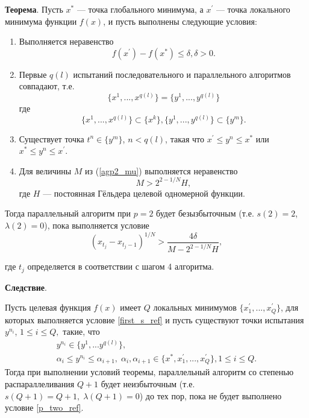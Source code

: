 \documentclass[10pt,a4paper]{book}
\begin{document}
\textbf{Теорема}. Пусть $x^*$ --- точка глобального минимума, а $x^{\prime}$ --- точка локального минимума функции $f(x)$, и пусть выполнены следующие условия:
    \begin{enumerate}
        \item Выполняется неравенство
            \begin{equation} \label{first_s_ref}
                f(x^{\prime}) - f(x^*) \leq \delta, \delta > 0.
            \end{equation}
        \item Первые $q(l)$ испытаний последовательного и параллельного алгоритмов совпадают, т.е.
            \begin{equation} \label{second_s_ref}
                \{x^1,...,x^{q(l)}\} = \{y^1,...,y^{q(l)}\}
            \end{equation}
        где
            \begin{equation} \label{third_s_ref}
                \{x^1,...,x^{q(l)}\} \subset \{x^k\}, \{y^1,...,y^{q(l)}\}\subset \{y^m\}.
            \end{equation}
        \item Существует точка $t^n \in \{y^m\}$, $n < q(l)$, такая что $x^{\prime} \leq y^n \leq x^*$ или $x^* \leq y^n \leq x^{\prime}$.
        \item Для величины $M$ из (\ref{agp2_mu}) выполняется неравенство 
            \begin{equation} \label{fourth_s_ref}
                M > 2^{2 - 1/N} H,
            \end{equation}
        где $H$ — постоянная Гёльдера целевой одномерной функции.
    \end{enumerate}

Тогда параллельный алгоритм при $p=2$ будет безызбыточным (т.е. $s(2)=2$, $\lambda(2)=0$), пока выполняется условие
\begin{equation} \label{p_two_ref}
    (x_{t_j} - x_{t_j - 1})^{1/N} > \frac{4\delta}{M - 2^{2 - 1/N} H},
\end{equation}

где $t_j$ определяется в соответствии с шагом 4 алгоритма.

\textbf{Следствие}.

Пусть целевая функция $f(x)$ имеет $Q$  локальных минимумов $\{x_1^{\prime},...,x_Q^{\prime}\}$, для которых выполняется условие \eqref{first_s_ref} и пусть существуют точки испытания $y^{n_i}$, $1 \leq i \leq Q,$ такие, что 
\begin{gather} 
    y^{n_i} \in \{y^1,...y^{q(l)}\}, \nonumber \\ 
    \alpha_i \leq y^{n_i} \leq \alpha_{i+1}, \; \alpha_i, \alpha_{i+1} \in \{x^*, x_1^{\prime},...,x_Q^{\prime}\}, 1 \leq i \leq Q. \nonumber
\end{gather}
Тогда при выполнении условий теоремы, параллельный алгоритм со степенью распараллеливания $Q+1$ будет неизбыточным (т.е. $s(Q+1)=Q+1, \; \lambda(Q+1) =0$) до тех пор, пока не будет выполнено условие \eqref{p_two_ref}.
\end{document}
